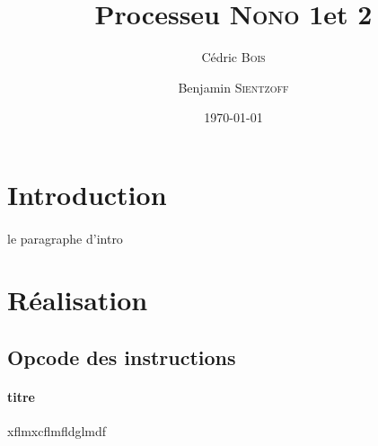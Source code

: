 \documentclass[a4paper]{article}
\title{Processeu \textsc{Nono} 1et 2}
\author{Cédric \textsc{Bois} \and Benjamin \textsc{Sientzoff}}
\date{\today}
\begin{document}
	\maketitle
	\newpage
	\tableofcontents
	\newpage %
	
	\section*{Introduction}
	\paragraph{}{le paragraphe d'intro}
	
	\section{Réalisation}
	
		\subsection{Opcode des instructions}
			
			\paragraph{titre }{xflmxcflmfldglmdf}
			
\end{document}
